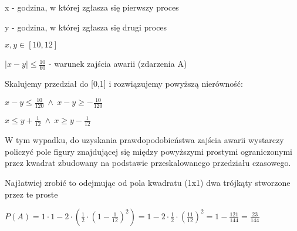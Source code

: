 \documentclass[fleqn]{article}
\begin{document}
\medskip
{}
\medskip

x - godzina, w której zgłasza się pierwszy proces

y - godzina, w której zgłasza się drugi proces

$x,y \in [10,12]$

$|x-y|\le\frac{10}{60}$ - warunek zajścia awarii (zdarzenia A)

Skalujemy przedział do [0,1] i rozwiązujemy powyższą nierówność:

$x-y\le\frac{10}{120} \ \wedge \ x-y\ge-\frac{10}{120}$

$x\le y+\frac{1}{12} \ \wedge \ x\ge y-\frac{1}{12}$

W tym wypadku, do uzyskania prawdopodobieństwa zajścia awarii wystarczy policzyć pole figury znajdującej się między powyższymi prostymi ograniczonymi przez kwadrat zbudowany na podstawie przeskalowanego przedziału czasowego.

Najłatwiej zrobić to odejmując od pola kwadratu (1x1) dwa trójkąty stworzone przez te proste

$P(A)=1\cdot1-2\cdot(\frac{1}{2}\cdot(1-\frac{1}{12})^{2})=1-2\cdot\frac{1}{2}\cdot(\frac{11}{12})^{2}=1-\frac{121}{144}=\frac{23}{144}$
\end{document}
